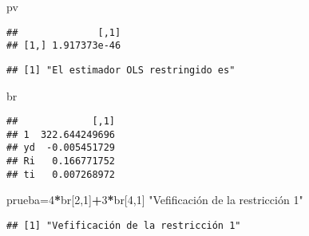 \documentclass[
]{article}
\newenvironment{Shaded}{\begin{snugshade}}{\end{snugshade}}
\newcommand{\CommentTok}[1]{\textcolor[rgb]{0.56,0.35,0.01}{\textit{#1}}}
\newcommand{\DecValTok}[1]{\textcolor[rgb]{0.00,0.00,0.81}{#1}}
\newcommand{\KeywordTok}[1]{\textcolor[rgb]{0.13,0.29,0.53}{\textbf{#1}}}
\newcommand{\NormalTok}[1]{#1}
\newcommand{\OperatorTok}[1]{\textcolor[rgb]{0.81,0.36,0.00}{\textbf{#1}}}
\newcommand{\StringTok}[1]{\textcolor[rgb]{0.31,0.60,0.02}{#1}}
\begin{document}
\begin{Shaded}
\begin{Highlighting}[]
\NormalTok{pv}
\end{Highlighting}
\end{Shaded}

\begin{verbatim}
##              [,1]
## [1,] 1.917373e-46
\end{verbatim}

\begin{Shaded}
\end{Shaded}

\begin{verbatim}
## [1] "El estimador OLS restringido es"
\end{verbatim}

\begin{Shaded}
\begin{Highlighting}[]
\NormalTok{br}
\end{Highlighting}
\end{Shaded}

\begin{verbatim}
##             [,1]
## 1  322.644249696
## yd  -0.005451729
## Ri   0.166771752
## ti   0.007268972
\end{verbatim}

\begin{Shaded}
\begin{Highlighting}[]
\NormalTok{prueba=}\DecValTok{4}\OperatorTok{*}\NormalTok{br[}\DecValTok{2}\NormalTok{,}\DecValTok{1}\NormalTok{]}\OperatorTok{+}\DecValTok{3}\OperatorTok{*}\NormalTok{br[}\DecValTok{4}\NormalTok{,}\DecValTok{1}\NormalTok{]}
\StringTok{"Vefificación de la restricción 1"}
\end{Highlighting}
\end{Shaded}

\begin{verbatim}
## [1] "Vefificación de la restricción 1"
\end{verbatim}
\end{document}
